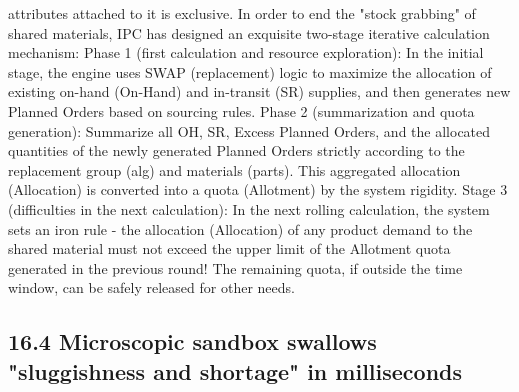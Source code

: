 \documentclass[11pt,a4paper]{article}
\begin{document}
attributes attached to it is exclusive. In order to end the "stock grabbing" of shared materials, IPC has designed an exquisite two-stage iterative calculation mechanism: Phase 1 (first calculation and resource exploration): In the initial stage, the engine uses SWAP (replacement) logic to maximize the allocation of existing on-hand (On-Hand) and in-transit (SR) supplies, and then generates new Planned Orders based on sourcing rules. Phase 2 (summarization and quota generation): Summarize all OH, SR, Excess Planned Orders, and the allocated quantities of the newly generated Planned Orders strictly according to the replacement group (alg) and materials (parts). This aggregated allocation (Allocation) is converted into a quota (Allotment) by the system rigidity. Stage 3 (difficulties in the next calculation): In the next rolling calculation, the system sets an iron rule - the allocation (Allocation) of any product demand to the shared material must not exceed the upper limit of the Allotment quota generated in the previous round! The remaining quota, if outside the time window, can be safely released for other needs.


\subsection*{16.4 Microscopic sandbox swallows "sluggishness and shortage" in milliseconds}
\end{document}
